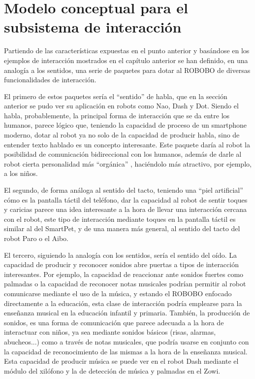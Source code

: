 \section{Modelo conceptual para el subsistema de interacción}
 \label{sec:modelo-conceptual}
 
 
 Partiendo de las características expuestas en el punto anterior y basándose en los ejemplos de interacción mostrados en el capítulo anterior se han definido, en una analogía a los sentidos, una serie de paquetes para dotar al ROBOBO de diversas funcionalidades de interacción.
 
 El primero de estos paquetes sería el \enquote{sentido} de habla, que en la sección anterior se pudo ver su aplicación en robots como Nao, Dash y Dot. Siendo el habla, probablemente, la principal forma de interacción que se da entre los humanos, parece lógico que, teniendo la capacidad de proceso de un smartphone moderno, dotar al robot ya no solo de la capacidad de producir habla, sino de entender texto hablado es un concepto interesante. Este paquete daría al robot la posibilidad de comunicación bidireccional con los humanos, además de darle al robot cierta personalidad más \enquote{orgánica} , haciéndolo más atractivo, por ejemplo, a los niños.
 
 El segundo, de forma análoga al sentido del tacto, teniendo una \enquote{piel artificial} cómo es la pantalla táctil del teléfono, dar la capacidad al robot de sentir toques y caricias parece una idea interesante a la hora de llevar una interacción cercana con el robot, este tipo de interacción mediante toques en la pantalla táctil es similar al del SmartPet, y de una manera más general, al sentido del tacto del robot Paro o el Aibo.
 
 El tercero, siguiendo la analogía con los sentidos, sería el sentido del oído. La capacidad de producir y reconocer sonidos abre puertas a tipos de interacción interesantes. Por ejemplo, la capacidad de reaccionar ante sonidos fuertes como palmadas o la capacidad de reconocer notas musicales podrían permitir al robot comunicarse mediante el uso de la música, y estando el ROBOBO enfocado directamente a la educación, esta clase de interacción podría emplearse para la enseñanza musical en la educación infantil y primaria. También, la producción de sonidos, es una forma de comunicación que parece adecuada a la hora de interactuar con niños, ya sea mediante sonidos básicos (risas, alarmas, abucheos...)  como a través de notas musicales, que podría usarse en conjunto con la capacidad de reconocimiento de las mismas a la hora de la enseñanza musical. Esta capacidad de producir música se puede ver en el robot Dash mediante el módulo del xilófono y la de detección de música y palmadas en el Zowi.
 
